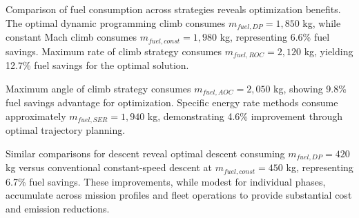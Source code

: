 Comparison of fuel consumption across strategies reveals optimization benefits. The optimal dynamic programming climb consumes $m_{fuel,DP} = 1,850$ kg, while constant Mach climb consumes $m_{fuel,const} = 1,980$ kg, representing 6.6\% fuel savings. Maximum rate of climb strategy consumes $m_{fuel,ROC} = 2,120$ kg, yielding 12.7\% fuel savings for the optimal solution.

Maximum angle of climb strategy consumes $m_{fuel,AOC} = 2,050$ kg, showing 9.8\% fuel savings advantage for optimization. Specific energy rate methods consume approximately $m_{fuel,SER} = 1,940$ kg, demonstrating 4.6\% improvement through optimal trajectory planning.

Similar comparisons for descent reveal optimal descent consuming $m_{fuel,DP} = 420$ kg versus conventional constant-speed descent at $m_{fuel,const} = 450$ kg, representing 6.7\% fuel savings. These improvements, while modest for individual phases, accumulate across mission profiles and fleet operations to provide substantial cost and emission reductions.